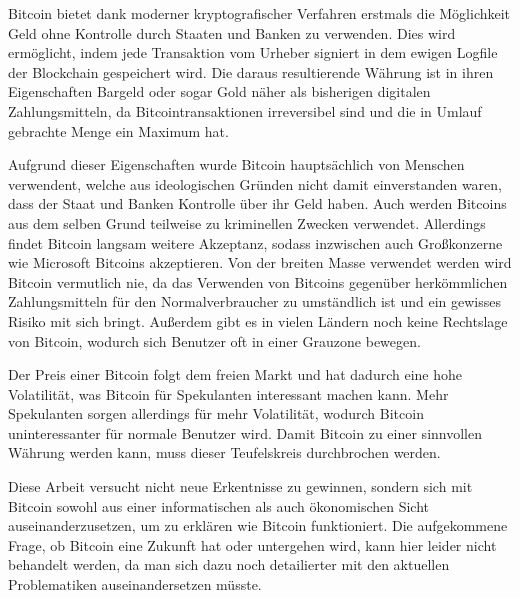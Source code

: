 Bitcoin bietet dank moderner kryptografischer Verfahren erstmals die Möglichkeit Geld ohne Kontrolle durch Staaten und Banken zu verwenden.
Dies wird ermöglicht, indem jede Transaktion vom Urheber signiert in dem ewigen Logfile der Blockchain gespeichert wird.
Die daraus resultierende Währung ist in ihren Eigenschaften Bargeld oder sogar Gold näher als bisherigen digitalen Zahlungsmitteln, da Bitcointransaktionen irreversibel sind und die in Umlauf gebrachte Menge ein Maximum hat.

Aufgrund dieser Eigenschaften wurde Bitcoin hauptsächlich von Menschen verwendent, welche aus ideologischen Gründen nicht damit einverstanden waren, dass der Staat und Banken Kontrolle über ihr Geld haben.
Auch werden Bitcoins aus dem selben Grund teilweise zu kriminellen Zwecken verwendet.
Allerdings findet Bitcoin langsam weitere Akzeptanz, sodass inzwischen auch Großkonzerne wie Microsoft Bitcoins akzeptieren.
Von der breiten Masse verwendet werden wird Bitcoin vermutlich nie, da das Verwenden von Bitcoins gegenüber herkömmlichen Zahlungsmitteln für den Normalverbraucher zu umständlich ist und ein gewisses Risiko mit sich bringt.
Außerdem gibt es in vielen Ländern noch keine Rechtslage von Bitcoin, wodurch sich Benutzer oft in einer Grauzone bewegen.

Der Preis einer Bitcoin folgt dem freien Markt und hat dadurch eine hohe Volatilität, was Bitcoin für Spekulanten interessant machen kann.
Mehr Spekulanten sorgen allerdings für mehr Volatilität, wodurch Bitcoin uninteressanter für normale Benutzer wird.
Damit Bitcoin zu einer sinnvollen Währung werden kann, muss dieser Teufelskreis durchbrochen werden.

Diese Arbeit versucht nicht neue Erkentnisse zu gewinnen, sondern sich mit Bitcoin sowohl aus einer informatischen als auch ökonomischen Sicht auseinanderzusetzen, um zu erklären wie Bitcoin funktioniert.
Die aufgekommene Frage, ob Bitcoin eine Zukunft hat oder untergehen wird, kann hier leider nicht behandelt werden, da man sich dazu noch detailierter mit den aktuellen Problematiken auseinandersetzen müsste.
